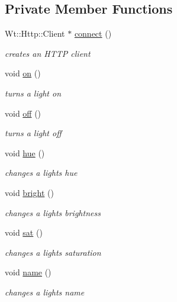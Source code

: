 \subsection*{Private Member Functions}
\begin{DoxyCompactItemize}
\item 
Wt\+::\+Http\+::\+Client $\ast$ \hyperlink{class_lights_control_widget_a4a43f535b11a174e2f9a5b9ffe773557}{connect} ()
\begin{DoxyCompactList}\small\item\em creates an H\+T\+TP client \end{DoxyCompactList}\item 
void \hyperlink{class_lights_control_widget_ad5e2249e08c869e8bd9b190937b93f3c}{on} ()
\begin{DoxyCompactList}\small\item\em turns a light on \end{DoxyCompactList}\item 
void \hyperlink{class_lights_control_widget_a5d39b8ccaa59c8a8f0c8669b45cf0eb2}{off} ()
\begin{DoxyCompactList}\small\item\em turns a light off \end{DoxyCompactList}\item 
void \hyperlink{class_lights_control_widget_a9d7e8c4b0f0549a9a7c3ef96c4d5eef0}{hue} ()
\begin{DoxyCompactList}\small\item\em changes a light\textquotesingle{}s hue \end{DoxyCompactList}\item 
void \hyperlink{class_lights_control_widget_a05224e6a3f891fb29bbf85548aad4684}{bright} ()
\begin{DoxyCompactList}\small\item\em changes a light\textquotesingle{}s brightness \end{DoxyCompactList}\item 
void \hyperlink{class_lights_control_widget_a154f0a2b37fbbd67c920b392086ec60c}{sat} ()
\begin{DoxyCompactList}\small\item\em changes a light\textquotesingle{}s saturation \end{DoxyCompactList}\item 
void \hyperlink{class_lights_control_widget_aa0b663545779e7dd38fa61e456b158ec}{name} ()
\begin{DoxyCompactList}\small\item\em changes a light\textquotesingle{}s name \end{DoxyCompactList}\item 

\end{DoxyCompactItemize}

